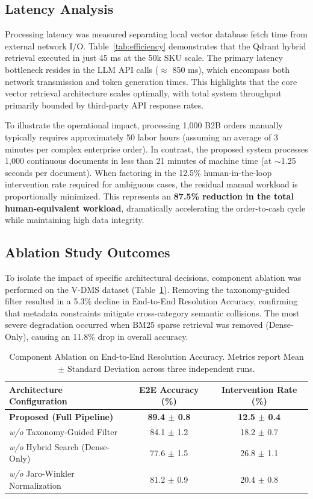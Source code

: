 \subsection{Latency Analysis}
Processing latency was measured separating local vector database fetch time from external network I/O. Table~\ref{tab:efficiency} demonstrates that the Qdrant hybrid retrieval executed in just 45 ms at the 50k SKU scale. The primary latency bottleneck resides in the LLM API calls ($\approx$ 850 ms), which encompass both network transmission and token generation times. This highlights that the core vector retrieval architecture scales optimally, with total system throughput primarily bounded by third-party API response rates.

To illustrate the operational impact, processing 1,000 B2B orders manually typically requires approximately 50 labor hours (assuming an average of 3 minutes per complex enterprise order). In contrast, the proposed system processes 1,000 continuous documents in less than 21 minutes of machine time (at $\sim$1.25 seconds per document). When factoring in the 12.5\% human-in-the-loop intervention rate required for ambiguous cases, the residual manual workload is proportionally minimized. This represents an \textbf{87.5\% reduction in the total human-equivalent workload}, dramatically accelerating the order-to-cash cycle while maintaining high data integrity.

\subsection{Ablation Study Outcomes}
To isolate the impact of specific architectural decisions, component ablation was performed on the V-DMS dataset (Table~\ref{tab:ablation}). Removing the taxonomy-guided filter resulted in a 5.3\% decline in End-to-End Resolution Accuracy, confirming that metadata constraints mitigate cross-category semantic collisions. The most severe degradation occurred when BM25 sparse retrieval was removed (Dense-Only), causing an 11.8\% drop in overall accuracy. 

\begin{table}[htbp]
    \centering
    \caption{Component Ablation on End-to-End Resolution Accuracy. Metrics report Mean $\pm$ Standard Deviation across three independent runs.}
    \label{tab:ablation}
    \renewcommand{\arraystretch}{1.2}
    \begin{tabular}{lcc}
        \hline
        \textbf{Architecture Configuration} & \textbf{E2E Accuracy (\%)} & \textbf{Intervention Rate (\%)} \\
        \hline
        \textbf{Proposed (Full Pipeline)} & \textbf{89.4 $\pm$ 0.8} & \textbf{12.5 $\pm$ 0.4} \\
        \textit{w/o} Taxonomy-Guided Filter & 84.1 $\pm$ 1.2 & 18.2 $\pm$ 0.7 \\
        \textit{w/o} Hybrid Search (Dense-Only) & 77.6 $\pm$ 1.5 & 26.8 $\pm$ 1.1 \\
        \textit{w/o} Jaro-Winkler Normalization & 81.2 $\pm$ 0.9 & 20.4 $\pm$ 0.8 \\
        \hline
    \end{tabular}
\end{table}


